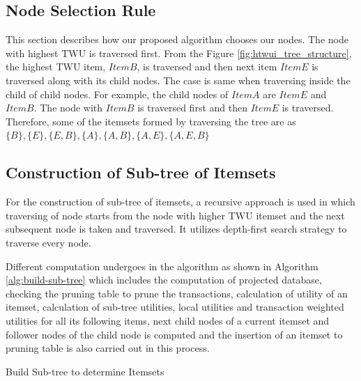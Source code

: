 \documentclass[11pt,openright]{report}
\begin{document}
\subsection{Node Selection Rule} {
	This section describes how our proposed algorithm chooses our nodes. The node with highest TWU is traversed first. From the Figure \ref{fig:htwui_tree_structure}, the highest TWU item, $Item B$, is traversed and then next item $Item E$ is traversed along with its child nodes. The case is same when traversing inside the child of child nodes. For example, the child nodes of $Item A$ are $Item E$ and $Item B$. The node with $Item B$ is traversed first and then $Item E$ is traversed. Therefore, some of the itemsets formed by traversing the tree are as  $\{B\}, \{E\}, \{E,B\}, \{A\},\{A,B\}, \{A,E\}, \{A,E,B\}$
}

\subsection{Construction of Sub-tree of Itemsets} \label{ss:sub-tree-itemsets}
For the construction of sub-tree of itemsets, a recursive approach is used in which traversing of node starts from the node with higher TWU itemset and the next subsequent node is taken and traversed. It utilizes depth-first search strategy to traverse every node.

Different computation undergoes in the algorithm as shown in Algorithm \ref{alg:build-sub-tree} which includes the computation of projected database, checking the pruning table to prune the transactions, calculation of utility of an itemset, calculation of sub-tree utilities, local utilities and transaction weighted utilities for all its following items, next child nodes of a current itemset and follower nodes of the child node is computed and the insertion of an itemset to pruning table is also carried out in this process.

 {\SetAlgoNoLine
 	\begin{algorithm}[h]
 		\caption{Build Sub-tree to determine Itemsets}
 		\label{alg:build-sub-tree}
 	\end{algorithm}
 }
\end{document}
